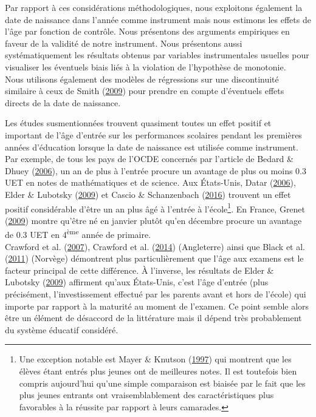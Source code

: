 \documentclass[
]{book}
\begin{document}
\quad Par rapport à ces considérations méthodologiques, nous exploitons également la date de naissance dans l'année comme instrument mais nous estimons les effets de l'âge par fonction de contrôle. Nous présentons des arguments empiriques en faveur de la validité de notre instrument. Nous présentons aussi systématiquement les résultats obtenus par variables instrumentales usuelles pour visualiser les éventuels biais liés à la violation de l'hypothèse de monotonie.\\
Nous utilisons également des modèles de régressions sur une discontinuité similaire à ceux de Smith (\protect\hyperlink{ref-SMI:09}{2009}) pour prendre en compte d'éventuels effets directs de la date de naissance.

\quad Les études susmentionnées trouvent quasiment toutes un effet positif et important de l'âge d'entrée sur les performances scolaires pendant les premières années d'éducation lorsque la date de naissance est utilisée comme instrument. Par exemple, de tous les pays de l'OCDE concernés par l'article de Bedard \& Dhuey (\protect\hyperlink{ref-BED:DHU:06}{2006}), un an de plus à l'entrée procure un avantage de plus ou moins 0.3 UET en notes de mathématiques et de science. Aux États-Unis, Datar (\protect\hyperlink{ref-DAT:06}{2006}), Elder \& Lubotsky (\protect\hyperlink{ref-ELD:LUB:09}{2009}) et Cascio \& Schanzenbach (\protect\hyperlink{ref-CAS:SCH:16}{2016}) trouvent un effet positif considérable d'être un an plus âgé à l'entrée à l'école\footnote{Une exception notable est Mayer \& Knutson (\protect\hyperlink{ref-MAY:KNU:97}{1997}) qui montrent que les élèves étant entrés plus jeunes ont de meilleures notes. Il est toutefois bien compris aujourd'hui qu'une simple comparaison est biaisée par le fait que les plus jeunes entrants ont vraisemblablement des caractéristiques plus favorables à la réussite par rapport à leurs camarades.}. En France, Grenet (\protect\hyperlink{ref-GRE:09}{2009}) montre qu'être né en janvier plutôt qu'en décembre procure un avantage de 0.3 UET en 4\textsuperscript{ème} année de primaire.\\
Crawford et al. (\protect\hyperlink{ref-CRA:eal:07}{2007}), Crawford et al. (\protect\hyperlink{ref-CRA:eal:14}{2014}) (Angleterre) ainsi que Black et al. (\protect\hyperlink{ref-BLA:eal:11}{2011}) (Norvège) démontrent plus particulièrement que l'âge aux examens est le facteur principal de cette différence. À l'inverse, les résultats de Elder \& Lubotsky (\protect\hyperlink{ref-ELD:LUB:09}{2009}) affirment qu'aux États-Unis, c'est l'âge d'entrée (plus précisément, l'investissement effectué par les parents avant et hors de l'école) qui importe par rapport à la maturité au moment de l'examen. Ce point semble alors être un élément de désaccord de la littérature mais il dépend très probablement du système éducatif considéré.\\
\end{document}
